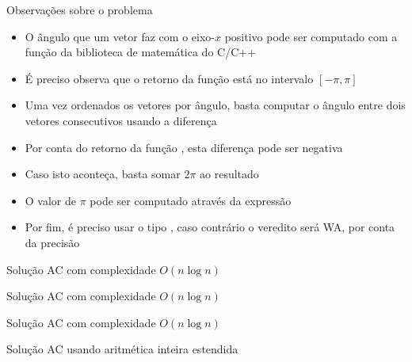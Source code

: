 \begin{frame}[fragile]{Observações sobre o problema}

    \begin{itemize}
        \item O ângulo que um vetor faz com o eixo-$x$ positivo pode ser computado com a 
            função  da biblioteca de matemática do C/C++
        \pause

        \item É preciso observa que o retorno da função está no intervalo $[-\pi, \pi]$
        \pause

        \item Uma vez ordenados os vetores por ângulo, basta computar o ângulo entre dois
            vetores consecutivos usando a diferença
        \pause

        \item Por conta do retorno da função , esta diferença pode ser 
            negativa
        \pause

        \item Caso isto aconteça, basta somar $2\pi$ ao resultado
        \pause

        \item O valor de $\pi$ pode ser computado através da expressão 
        \pause

        \item Por fim, é preciso usar o tipo , caso contrário o
            veredito será WA, por conta da precisão
    \end{itemize}

\end{frame}

\begin{frame}[fragile]{Solução AC com complexidade $O(n \log n)$}
\end{frame}

\begin{frame}[fragile]{Solução AC com complexidade $O(n \log n)$}
\end{frame}

\begin{frame}[fragile]{Solução AC com complexidade $O(n \log n)$}
\end{frame}

\begin{frame}[fragile]{Solução AC usando aritmética inteira estendida}
\end{frame}

